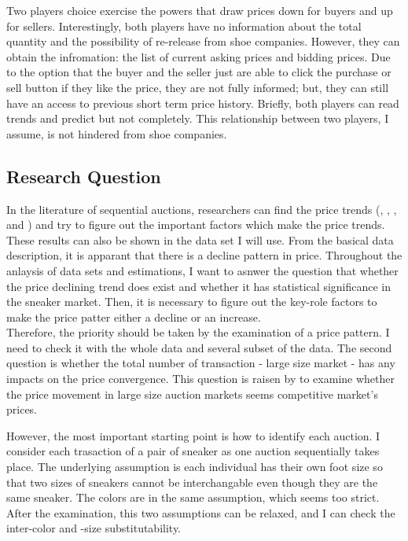 \documentclass[a4paper]{article}
\theoremstyle{definition}
\theoremstyle{definition}
\theoremstyle{remark}
\begin{document}
\begin{large}
Two players choice exercise the powers that draw prices down for buyers and up for sellers. Interestingly, both players have no information about the total quantity and the possibility of re-release from shoe companies. However, they can obtain the infromation: the list of current asking prices and bidding prices. Due to the option that the buyer and the seller just are able to click the purchase or sell button if they like the price, they are not fully informed; but, they can still have an access to previous short term price history. Briefly, both players can read trends and predict but not completely. This relationship between two players, I assume, is not hindered from shoe companies.

\subsection{Research Question}

In the literature of sequential auctions, researchers can find the price trends (\textcite{ashenfelter1992testing}, \textcite{ginsburgh1998absentee}, \textcite{deltas1999auction}, and \textcite{deltas2004catalogue}) and try to figure out the important factors which make the price trends. These results can also be shown in the data set I will use. From the basical data description, it is apparant that there is a decline pattern in price. Throughout the anlaysis of data sets and estimations, I want to asnwer the question that whether the price declining trend does exist and whether it has statistical significance in the sneaker market. Then, it is necessary to figure out the key-role factors to make the price patter either a decline or an increase.  \\

Therefore, the priority should be taken by the examination of a price pattern. I need to check it with the whole data and several subset of the data. The second question is whether the total number of transaction - large size market - has any impacts on the price convergence. This question is raisen by \textcite{deltas1999auction} to examine whether the price movement in large size auction markets seems competitive market's prices. 

However, the most important starting point is how to identify each auction. I consider each trasaction of a pair of sneaker as one auction sequentially takes place. The underlying assumption is each individual has their own foot size so that two sizes of sneakers cannot be interchangable even though they are the same sneaker. The colors are in the same assumption, which seems too strict. After the examination, this two assumptions can be relaxed, and I can check the inter-color and -size substitutability.


\end{large}
\end{document}
